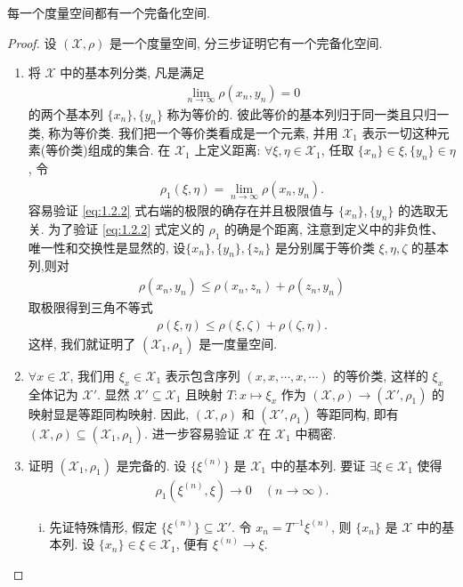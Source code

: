 \documentclass[../../main.tex]{subfiles}%
\begin{document}
\begin{theorem}\label{theorem:每一个度量空间都有一个完备化空间}
每一个度量空间都有一个完备化空间.
\end{theorem}
\begin{proof}

设 $(\mathscr{X},\rho)$ 是一个度量空间, 分三步证明它有一个完备化空间.
\begin{enumerate}[(1)]
\item 将 $\mathscr{X}$ 中的基本列分类, 凡是满足
\begin{align*}
\lim\limits_{n\to\infty}\rho(x_n,y_n)=0
\end{align*}
的两个基本列 $\{x_n\},\{y_n\}$ 称为等价的. 彼此等价的基本列归于同一类且只归一类, 称为等价类. 我们把一个等价类看成是一个元素, 并用 $\mathscr{X}_1$ 表示一切这种元素(等价类)组成的集合. 在 $\mathscr{X}_1$ 上定义距离: $\forall\xi,\eta\in\mathscr{X}_1$, 任取 $\{x_n\}\in\xi,\{y_n\}\in\eta$, 令
\begin{align}
\rho_1(\xi,\eta)=\lim\limits_{n\to\infty}\rho(x_n,y_n).\label{eq:1.2.2}
\end{align}
容易验证 \eqref{eq:1.2.2} 式右端的极限的确存在并且极限值与 $\{x_n\},\{y_n\}$ 的选取无关. 为了验证 \eqref{eq:1.2.2} 式定义的 $\rho_1$ 的确是个距离, 注意到定义中的非负性、唯一性和交换性是显然的, 设$\{x_n\},\{y_n\},\{z_n\}$ 是分别属于等价类 $\xi,\eta,\zeta$ 的基本列,则对
\begin{align*}
\rho(x_n,y_n)\leqslant\rho(x_n,z_n)+\rho(z_n,y_n)
\end{align*}
取极限得到三角不等式
\begin{align*}
\rho(\xi,\eta)\leqslant\rho(\xi,\zeta)+\rho(\zeta,\eta).
\end{align*}
这样, 我们就证明了 $(\mathscr{X}_1,\rho_1)$ 是一度量空间.

\item $\forall x\in\mathscr{X}$, 我们用 $\xi_x\in\mathscr{X}_1$ 表示包含序列 $(x,x,\cdots,x,\cdots)$ 的等价类, 这样的 $\xi_x$ 全体记为 $\mathscr{X}'$. 显然 $\mathscr{X}'\subseteq\mathscr{X}_1$ 且映射 $T:x\mapsto\xi_x$ 作为 $(\mathscr{X},\rho)\to(\mathscr{X}',\rho_1)$ 的映射显是等距同构映射. 因此, $(\mathscr{X},\rho)$ 和 $(\mathscr{X}',\rho_1)$ 等距同构, 即有 $(\mathscr{X},\rho)\subseteq(\mathscr{X}_1,\rho_1)$. 进一步容易验证 $\mathscr{X}$ 在 $\mathscr{X}_1$ 中稠密.

\item 证明 $(\mathscr{X}_1,\rho_1)$ 是完备的. 设 $\{\xi^{(n)}\}$ 是 $\mathscr{X}_1$ 中的基本列. 要证 $\exists\xi\in\mathscr{X}_1$ 使得
\begin{align*}
\rho_1(\xi^{(n)},\xi)\to0\quad (n\to\infty).
\end{align*}
\begin{enumerate}[(i)]
\item 先证特殊情形, 假定 $\{\xi^{(n)}\}\subseteq\mathscr{X}'$. 令 $x_n=T^{-1}\xi^{(n)}$, 则 $\{x_n\}$ 是 $\mathscr{X}$ 中的基本列. 设 $\{x_n\}\in\xi\in\mathscr{X}_1$, 便有 $\xi^{(n)}\to\xi$.


\end{enumerate}
\end{enumerate}
\end{proof}
\end{document}
